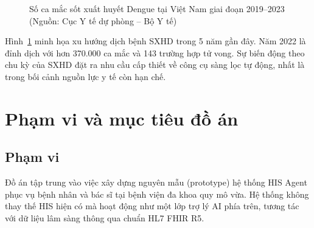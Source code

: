\documentclass[a4paper,13pt,3p,twoside,openany]{report}
\theoremstyle{definition}
\theoremstyle{remark}
\theoremstyle{definition}
\let\ORIGsection\section
\let\ORIGsubsection\subsection
\renewcommand{\section}{\needspace{3\baselineskip}\ORIGsection}
\renewcommand{\subsection}{\needspace{3\baselineskip}\ORIGsubsection}
\begin{document}
\begin{figure}[H]
\centering
{}
\caption{Số ca mắc sốt xuất huyết Dengue tại Việt Nam giai đoạn 2019--2023 (Nguồn: Cục Y tế dự phòng -- Bộ Y tế)}
\label{fig:dengue-stats}
\end{figure}

Hình~\ref{fig:dengue-stats} minh họa xu hướng dịch bệnh SXHD trong 5 năm gần đây. Năm 2022 là đỉnh dịch với hơn 370.000 ca mắc và 143 trường hợp tử vong. Sự biến động theo chu kỳ của SXHD đặt ra nhu cầu cấp thiết về công cụ sàng lọc tự động, nhất là trong bối cảnh nguồn lực y tế còn hạn chế.

\section{Phạm vi và mục tiêu đồ án}

\subsection{Phạm vi}

Đồ án tập trung vào việc xây dựng nguyên mẫu (prototype) hệ thống HIS Agent phục vụ bệnh nhân và bác sĩ tại bệnh viện đa khoa quy mô vừa. Hệ thống không thay thế HIS hiện có mà hoạt động như một lớp trợ lý AI phía trên, tương tác với dữ liệu lâm sàng thông qua chuẩn HL7 FHIR R5.
\end{document}
